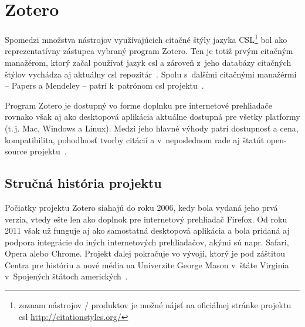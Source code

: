 \documentclass[
  color,
  table,
  nolof,
  oneside,
]{fithesis3}
\begin{document}
	
\section{Zotero}\label{zotero}

Spomedzi množstva nástrojov využívajúcich citačné štýly jazyka CSL\footnote{zoznam nástrojov / produktov je možné nájsť na oficiálnej stránke projektu \gls{csl} \url{http://citationstyles.org/}} bol ako reprezentatívny zástupca vybraný program Zotero. Ten je totiž prvým citačným manažérom, ktorý začal používať jazyk \gls{csl} a zároveň z~jeho databázy citačných štýlov vychádza aj aktuálny \gls{csl} repozitár~\cite{Fenner2010}. Spolu s~ďalšími citačnými manažérmi -- Papers a Mendeley -- patrí k~patrónom \gls{csl} projektu~\cite{csl:about}.

Program Zotero je dostupný vo forme doplnku pre internetové prehliadače rovnako však aj ako desktopová aplikácia aktuálne dostupná pre všetky platformy (t.\,j. Mac, Windows a Linux). Medzi jeho hlavné výhody patrí dostupnosť a cena, kompatibilita, pohodlnosť tvorby citácií a v~neposlednom rade aj štatút open-source projektu~\cite{Ansorge2013}. %

\subsection{Stručná história projektu}

Počiatky projektu Zotero siahajú do roku 2006, kedy bola vydaná jeho prvá verzia, vtedy ešte len ako doplnok pre internetový prehliadač Firefox. Od roku 2011 však už funguje aj ako samostatná desktopová aplikácia a bola pridaná aj podpora integrácie do iných internetových prehliadačov, akými sú napr. Safari, Opera alebo Chrome. Projekt ďalej pokračuje vo vývoji, ktorý je pod záštitou Centra pre históriu a nové média na Univerzite George Mason v~štáte Virginia v~Spojených štátoch amerických~\cite{Puckett2011}.


\end{document}
